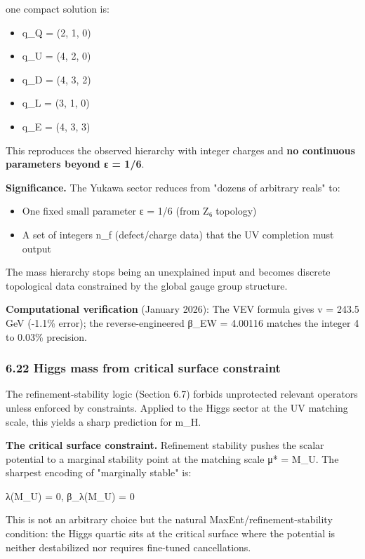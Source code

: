 one compact solution is:

\begin{itemize}
\tightlist
\item
  q\_Q = (2, 1, 0)
\item
  q\_U = (4, 2, 0)
\item
  q\_D = (4, 3, 2)
\item
  q\_L = (3, 1, 0)
\item
  q\_E = (4, 3, 3)
\end{itemize}

This reproduces the observed hierarchy with integer charges and \textbf{no continuous parameters beyond ε = 1/6}.

\textbf{Significance.} The Yukawa sector reduces from "dozens of arbitrary reals" to:

\begin{itemize}
\tightlist
\item
  One fixed small parameter ε = 1/6 (from Z₆ topology)
\item
  A set of integers n\_f (defect/charge data) that the UV completion must output
\end{itemize}

The mass hierarchy stops being an unexplained input and becomes discrete topological data constrained by the global gauge group structure.

\textbf{Computational verification} (January 2026): The VEV formula gives v = 243.5 GeV (-1.1\% error); the reverse-engineered β\_EW = 4.00116 matches the integer 4 to 0.03\% precision.

\subsubsection{6.22 Higgs mass from critical surface constraint}\label{622-higgs-mass-from-critical-surface-constraint}

The refinement-stability logic (Section 6.7) forbids unprotected relevant operators unless enforced by constraints. Applied to the Higgs sector at the UV matching scale, this yields a sharp prediction for m\_H.

\textbf{The critical surface constraint.} Refinement stability pushes the scalar potential to a marginal stability point at the matching scale μ* = M\_U. The sharpest encoding of "marginally stable" is:

λ(M\_U) = 0, β\_λ(M\_U) = 0

This is not an arbitrary choice but the natural MaxEnt/refinement-stability condition: the Higgs quartic sits at the critical surface where the potential is neither destabilized nor requires fine-tuned cancellations.

